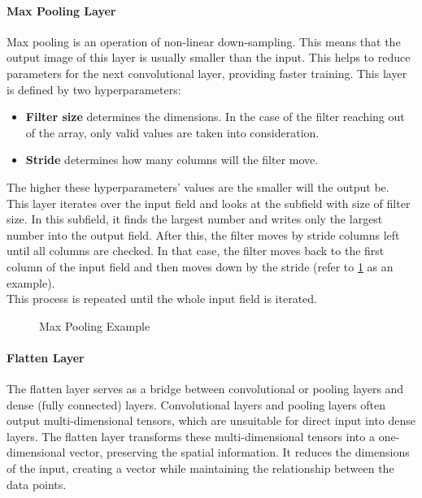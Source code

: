 \paragraph{Max Pooling Layer}
Max pooling is an operation of non-linear down-sampling. This means that the output image of this layer is usually smaller than the input. This helps to reduce parameters for the next convolutional layer, providing faster training.  This layer is defined by two hyperparameters:

\begin{itemize}
	\item \textbf{Filter size} determines the dimensions. In the case of the filter reaching out of the array, only valid values are taken into consideration.
	\item \textbf{Stride} determines how many columns will the filter move.
\end{itemize}

The higher these hyperparameters' values are the smaller will the output be.\\
This layer iterates over the input field and looks at the subfield with size of filter size. In this subfield, it finds the largest number and writes only the largest number into the output field. After this, the filter moves by stride columns left until all columns are checked. In that case, the filter moves back to the first column of the input field and then moves down by the stride (refer to \ref{maxPooling} as an example).\\ This process is repeated until the whole input field is iterated.

\begin{figure}
	\caption[Max Pooling Example]{Max Pooling Example \cite{pooling}}
	\label{maxPooling}
\end{figure}

\paragraph{Flatten Layer}
The flatten layer serves as a bridge between convolutional or pooling layers and dense (fully connected) layers. Convolutional layers and pooling layers often output multi-dimensional tensors, which are unsuitable for direct input into dense layers. The flatten layer transforms these multi-dimensional tensors into a one-dimensional vector, preserving the spatial information. It reduces the dimensions of the input, creating a vector while maintaining the relationship between the data points.
